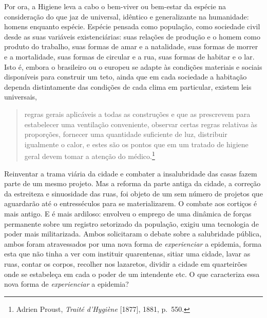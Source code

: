 Por ora, a Higiene leva a cabo o bem-viver ou bem-estar da espécie na
consideração do que jaz de universal, idêntico e generalizante na
humanidade: homens enquanto espécie. Espécie pensada como população,
como sociedade civil desde as suas variáveis existenciárias: suas
relações de produção e o homem como produto do trabalho, suas formas de
amar e a natalidade, suas formas de morrer e a mortalidade, suas formas
de circular e a rua, suas formas de habitar e o lar. Isto é, embora o
brasileiro ou o europeu se adapte às condições materiais e sociais
disponíveis para construir um teto, ainda que em cada sociedade a
habitação dependa distintamente das condições de cada clima em
particular, existem leis universais,

\begin{quote}
regras gerais aplicáveis a todas as construções e que as prescrevem para
estabelecer uma ventilação conveniente, observar certas regras relativas
às proporções, fornecer uma quantidade suficiente de luz, distribuir
igualmente o calor, e estes são os pontos que em um tratado de higiene
geral devem tomar a atenção do médico.\footnote{Adrien Proust,
  \emph{Traité d'Hygiène} {[}1877{]}, 1881, p.~550.}
\end{quote}

Reinventar a trama viária da cidade e combater a insalubridade das casas
fazem parte de um mesmo projeto. Mas a reforma da parte antiga da
cidade, a correção da estreiteza e sinuosidade das ruas, foi objeto de
um sem número de projetos que aguardarão até o entresséculos para se
materializarem. O combate aos cortiços é mais antigo. E é mais ardiloso:
envolveu o emprego de uma dinâmica de forças permanente sobre um
registro setorizado da população, exigiu uma tecnologia de poder mais
militarizada. Ambos solicitaram o debate sobre a salubridade pública,
ambos foram atravessados por uma nova forma de \emph{experienciar} a
epidemia, forma esta que não tinha a ver com instituir quarentenas,
sitiar uma cidade, lavar as ruas, contar os corpos, recolher nos
lazaretos, dividir a cidade em quarteirões onde se estabeleça em cada o
poder de um intendente etc. O que caracteriza essa nova forma de
\emph{experienciar} a epidemia?

